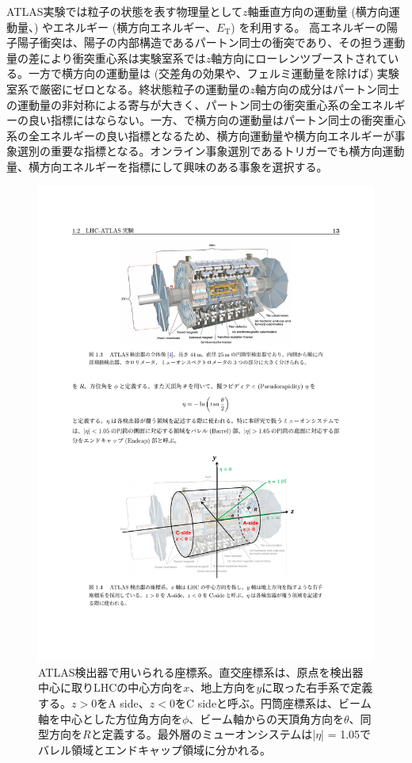 ATLAS実験では粒子の状態を表す物理量として$z$軸垂直方向の運動量 (横方向運動量、\pt) やエネルギー (横方向エネルギー、$E_{\mathrm{T}}$) を利用する。
高エネルギーの陽子陽子衝突は、陽子の内部構造であるパートン同士の衝突であり、その担う運動量の差により衝突重心系は実験室系では$z$軸方向にローレンツブーストされている。一方で横方向の運動量は (交差角の効果や、フェルミ運動量を除けば) 実験室系で厳密にゼロとなる。終状態粒子の運動量の$z$軸方向の成分はパートン同士の運動量の非対称による寄与が大きく、パートン同士の衝突重心系の全エネルギーの良い指標にはならない。一方、で横方向の運動量はパートン同士の衝突重心系の全エネルギーの良い指標となるため、横方向運動量や横方向エネルギーが事象選別の重要な指標となる。オンライン事象選別であるトリガーでも横方向運動量、横方向エネルギーを指標にして興味のある事象を選択する。

\begin{figure} 
\centering
\includegraphics[width=16cm]{fig/Intro/ATLAScordination.pdf}
\caption[ATLAS検出器における座標系]{ATLAS検出器で用いられる座標系。直交座標系は、原点を検出器中心に取りLHCの中心方向を$x$、地上方向を$y$に取った右手系で定義する。$z>0$をA side、$z<0$をC sideと呼ぶ。円筒座標系は、ビーム軸を中心とした方位角方向を$\phi$、ビーム軸からの天頂角方向を$\theta$、同型方向を$R$と定義する。最外層のミューオンシステムは|$\eta$| = 1.05でバレル領域とエンドキャップ領域に分かれる。}
\label{ATLAScordination}
\end{figure}

